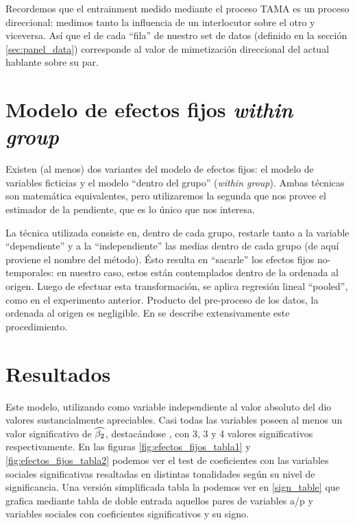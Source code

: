 Recordemos que el entrainment medido mediante el proceso TAMA es un proceso direccional: medimos tanto la influencia de un interlocutor sobre el otro y viceversa. Así que el \entrainment de cada ``fila'' de nuestro set de datos (definido en la sección \ref{sec:panel_data}) corresponde al valor de mimetización direccional del actual hablante sobre su par.


\section{Modelo de efectos fijos \emph{within group}}

Existen (al menos) dos variantes del modelo de efectos fijos: el modelo de variables ficticias y el modelo ``dentro del grupo'' (\emph{within group}). Ambas técnicas son matemática equivalentes, pero utilizaremos la segunda que nos provee el estimador de la pendiente, que es lo único que nos interesa.

La técnica utilizada consiste en, dentro de cada grupo, restarle tanto a la variable ``dependiente'' y a la ``independiente'' las medias dentro de cada grupo (de aquí proviene el nombre del método). Ésto resulta en ``sacarle'' los efectos fijos no-temporales: en nuestro caso, estos están contemplados dentro de la ordenada al origen. Luego de efectuar esta transformación, se aplica regresión lineal ``pooled'', como en el experimento anterior. Producto del pre-proceso de los datos, la ordenada al origen es negligible. En \cite[chap 16]{gujarati1999} se describe extensivamente este procedimiento.


\section{Resultados}

Este modelo, utilizando como variable independiente al valor absoluto del \entrainment dio valores sustancialmente apreciables. Casi todas las variables \ap poseen al menos un valor significativo de $\widehat{\beta_2}$, destacándose \ENGMEAN, \NOISETOHARMONICS \FOMEAN  con 3, 3 y 4 valores significativos respectivamente. En las figuras \ref{fig:efectos_fijos_tabla1} y \ref{fig:efectos_fijos_tabla2} podemos ver el test de coeficientes con las variables sociales significativas resaltadas en distintas tonalidades según su nivel de significancia. Una versión simplificada tabla la podemos ver en \ref{sign_table} que grafica mediante tabla de doble entrada aquellos pares de variables a/p y variables sociales con coeficientes significativos y su signo.


